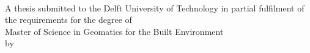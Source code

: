 \thispagestyle{empty}

\begin{titlepage}
  \begin{addmargin}[-1cm]{-3cm}
    \begin{center}  
        \hfill
        \vfill

        \begingroup
            \LARGE \color{cyan}\spacedallcaps{\myTitle}\\
        \endgroup
        \vspace{0.5cm}
        \begingroup
        \large\mySubTitle
        \endgroup
        
        \vspace{5cm}
        
        A thesis submitted to the Delft University of Technology in partial fulfilment of the requirements for the degree of\\
        \vspace{2cm}
        Master of Science in Geomatics for the Built Environment\\
        \vspace{4cm}
        by\\
        \bigskip
        \myName\\
        \bigskip
        \myGraduationMonth\xspace\myGraduationYear\\

        \vfill

    \end{center}  
  \end{addmargin}       
\end{titlepage}  
